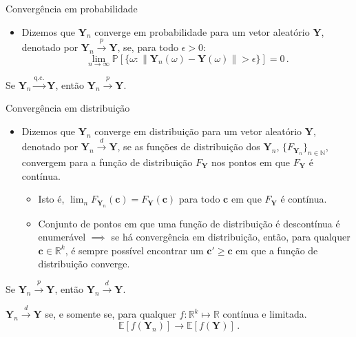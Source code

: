 \documentclass[11pt]{beamer}
\begin{document}
	\begin{frame}{Convergência em probabilidade}
		\begin{itemize}
				\item Dizemos que $\boldsymbol{Y}_n$ converge em probabilidade para um vetor aleatório $\boldsymbol{Y}$, denotado por $\boldsymbol{Y}_n \overset{p}{\to} \boldsymbol{Y}$, se, para todo $\epsilon > 0$:
					$$\lim_{n \to \infty} \mathbb{P}\left[\{\omega: \lVert\boldsymbol{Y}_n(\omega)-\boldsymbol{Y}(\omega)\rVert > \epsilon\}\right]= 0\, .$$
				
		\end{itemize}
		\begin{lemma}
			Se $\boldsymbol{Y}_n \overset{\text{q.c.}}{\to} \boldsymbol{Y}$, então $\boldsymbol{Y}_n \overset{p}{\to} \boldsymbol{Y}$.
		\end{lemma}
	\end{frame}
	
	\begin{frame}{Convergência em distribuição}
			\begin{itemize}
			\item Dizemos que $\boldsymbol{Y}_n$ converge em distribuição para um vetor aleatório $\boldsymbol{Y}$, denotado por $\boldsymbol{Y}_n \overset{d}{\to} \boldsymbol{Y}$, se as funções de distribuição dos $\boldsymbol{Y}_n$, $\{F_{\boldsymbol{Y}_n}\}_{n \in \mathbb{N}}$, convergem para a função de distribuição $F_{\boldsymbol{Y}}$ nos pontos em que  $F_{\boldsymbol{Y}}$ é contínua.
						\begin{itemize}
				\item Isto é, $\lim_n F_{\boldsymbol{Y}_n}(\boldsymbol{c}) = F_{\boldsymbol{Y}}(\boldsymbol{c}) $ para todo $\boldsymbol{c}$ em que $F_{\boldsymbol{Y}}$ é contínua.
						\item Conjunto de pontos em que uma função de distribuição é descontínua é enumerável $\implies$ se há convergência em distribuição, então, para qualquer $\boldsymbol{c} \in \mathbb{R}^k$, é sempre possível encontrar um $\boldsymbol{c}' \geq \boldsymbol{c}$ em que a função de distribuição converge.
					\end{itemize}
					

		\end{itemize}
		\begin{lemma}
			Se $\boldsymbol{Y}_n \overset{p}{\to} \boldsymbol{Y}$, então $\boldsymbol{Y}_n \overset{d}{\to} \boldsymbol{Y}$.
		\end{lemma}
		\begin{lemma}
		$\boldsymbol{Y}_n \overset{d}{\to} \boldsymbol{Y}$ se, e somente se, para qualquer $f: \mathbb{R}^k \mapsto \mathbb{R}$ contínua e limitada.
			$$\mathbb{E}[f(\boldsymbol{Y}_n )] \to \mathbb{E}[f(\boldsymbol{Y} )]\, .$$
		\end{lemma}
	\end{frame}
	
\end{document}

